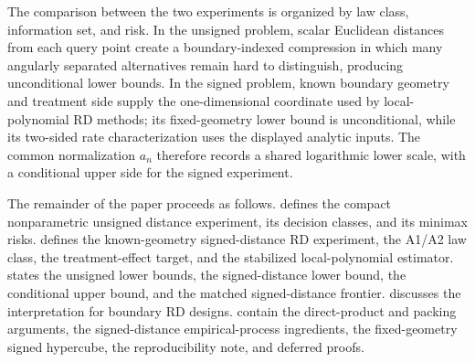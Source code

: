 The comparison between the two experiments is organized by law class, information set, and risk. In the unsigned problem, scalar Euclidean distances from each query point create a boundary-indexed compression in which many angularly separated alternatives remain hard to distinguish, producing unconditional lower bounds. In the signed problem, known boundary geometry and treatment side supply the one-dimensional coordinate used by local-polynomial RD methods; its fixed-geometry lower bound is unconditional, while its two-sided rate characterization uses the displayed analytic inputs. The common normalization \(a_n\) therefore records a shared logarithmic lower scale, with a conditional upper side for the signed experiment.

The remainder of the paper proceeds as follows.  defines the compact nonparametric unsigned distance experiment, its decision classes, and its minimax risks.  defines the known-geometry signed-distance RD experiment, the A1/A2 law class, the treatment-effect target, and the stabilized local-polynomial estimator.  states the unsigned lower bounds, the signed-distance lower bound, the conditional upper bound, and the matched signed-distance frontier.  discusses the interpretation for boundary RD designs.  contain the direct-product and packing arguments, the signed-distance empirical-process ingredients, the fixed-geometry signed hypercube, the reproducibility note, and deferred proofs.
